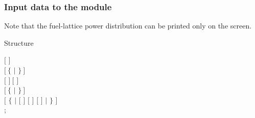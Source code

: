 \vskip 0.2cm

\subsubsection{Input data to the  module}

\noindent
Note that the fuel-lattice power distribution can be printed only on the screen.\\

\begin{DataStructure}{Structure }

$[$   $]$ \\
$[~\{$    $|$   $\}~]$ \\
$[$   $]~[$  $]$ \\
$[~\{$   $|$   $\}~]$ \\
$[$  $\{$  $|$  $[$  $]$
$[$  $]$ $[$  $]$ $|$  $\}$ $]$ \\
;
\end{DataStructure}

